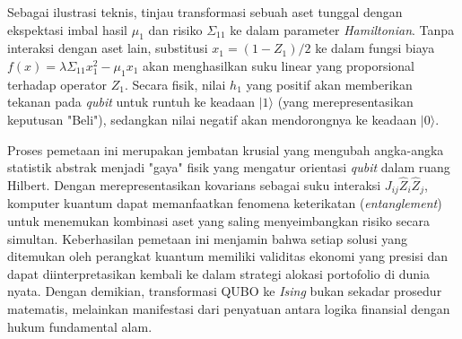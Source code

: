 \begin{example}
    Sebagai ilustrasi teknis, tinjau transformasi sebuah aset tunggal dengan ekspektasi imbal hasil $\mu_1$ dan risiko $\Sigma_{11}$ ke dalam parameter \textit{Hamiltonian}. Tanpa interaksi dengan aset lain, substitusi $x_1 = (1 - Z_1)/2$ ke dalam fungsi biaya $f(x) = \lambda \Sigma_{11} x_1^2 - \mu_1 x_1$ akan menghasilkan suku linear yang proporsional terhadap operator $Z_1$. Secara fisik, nilai $h_1$ yang positif akan memberikan tekanan pada \textit{qubit} untuk runtuh ke keadaan $|1\rangle$ (yang merepresentasikan keputusan "Beli"), sedangkan nilai negatif akan mendorongnya ke keadaan $|0\rangle$.

    Proses pemetaan ini merupakan jembatan krusial yang mengubah angka-angka statistik abstrak menjadi "gaya" fisik yang mengatur orientasi \textit{qubit} dalam ruang Hilbert. Dengan merepresentasikan kovarians sebagai suku interaksi $J_{ij} \hat{Z}_i \hat{Z}_j$, komputer kuantum dapat memanfaatkan fenomena keterikatan (\textit{entanglement}) untuk menemukan kombinasi aset yang saling menyeimbangkan risiko secara simultan. Keberhasilan pemetaan ini menjamin bahwa setiap solusi yang ditemukan oleh perangkat kuantum memiliki validitas ekonomi yang presisi dan dapat diinterpretasikan kembali ke dalam strategi alokasi portofolio di dunia nyata. Dengan demikian, transformasi QUBO ke \textit{Ising} bukan sekadar prosedur matematis, melainkan manifestasi dari penyatuan antara logika finansial dengan hukum fundamental alam.
\end{example}